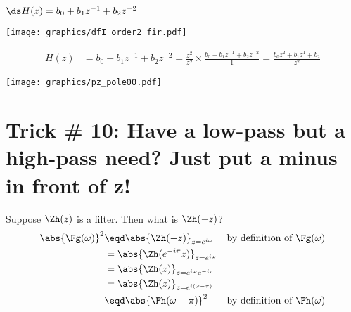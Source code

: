  $\ds H(z)= b_0 + b_1 z^{-1} + b_2 z^{-2}$

\texttt{[image: graphics/dfI\_order2\_fir.pdf]}


\begin{align*}
  H(z)
    &= b_0 + b_1 z^{-1} + b_2 z^{-2}
     = \frac{z^2}{z^2} \times \frac{b_0 + b_1 z^{-1} + b_2 z^{-2}}{1}
     = \frac{b_0 z^2 + b_1 z^{1} + b_2 }{z^2}
\end{align*}

\texttt{[image: graphics/pz\_pole00.pdf]}

\section*{Trick \# 10: Have a low-pass but a high-pass need? Just put a minus in front of z!}
Suppose $\Zh(z)$ is a  filter. \qquad Then what is  $\Zh(-z)$?
\begin{align*}
  \abs{\Fg(\omega)}^2
    &\eqd \abs{\Zh(-z)}_{z=e^{i\omega}}
    && \text{by definition of $\Fg(\omega)$}
  \\&= \abs{\Zh(e^{-i\pi}z)}_{z=e^{i\omega}}
  \\&= \abs{\Zh(z)}_{z=e^{i\omega}e^{-i\pi}}
  \\&= \abs{\Zh(z)}_{z=e^{i(\omega-\pi)}}
  \\&\eqd \abs{\Fh(\omega-\pi)}^2
    && \text{by definition of $\Fh(\omega)$}
\end{align*}


